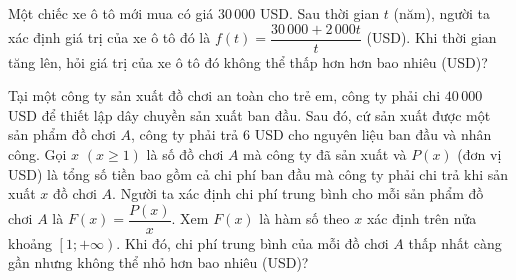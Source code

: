 
\begin{bt}%
	Một chiếc xe ô tô mới mua có giá $30\,000$ USD. Sau thời gian $t$ (năm), người ta xác định giá trị của xe ô tô đó là $f(t)=\dfrac{30\,000+2\,000t}{t}$  (USD).
	Khi thời gian tăng lên, hỏi giá trị của xe ô  tô đó không thể thấp hơn hơn bao nhiêu (USD)?
\end{bt}

\begin{bt}%
	Tại một công ty sản xuất đồ chơi an toàn cho trẻ em, công ty phải chi $40\,000$ USD để thiết lập dây chuyền sản xuất ban đầu. Sau đó, cứ sản xuất được một sản phẩm đồ chơi $A$, công ty phải trả $6$ USD cho nguyên liệu ban đầu và nhân công. Gọi $x$ $(x\ge 1)$ là số đồ chơi $A$ mà công ty đã sản xuất và $P(x)$ (đơn vị USD) là tổng số tiền bao gồm cả chi phí ban đầu mà công ty phải chi trả khi sản xuất $x$ đồ chơi $A$. Người ta xác định chi phí trung bình cho mỗi sản phẩm đồ chơi $A$ là $F(x)=\dfrac{P(x)}{x}$. Xem $F(x)$ là hàm số theo $x$ xác định trên nửa khoảng $\left[1; +\infty\right)$. Khi đó, chi phí trung bình của mỗi đồ  chơi $A$ thấp nhất càng gần nhưng không thể nhỏ hơn bao nhiêu (USD)?
\end{bt}

